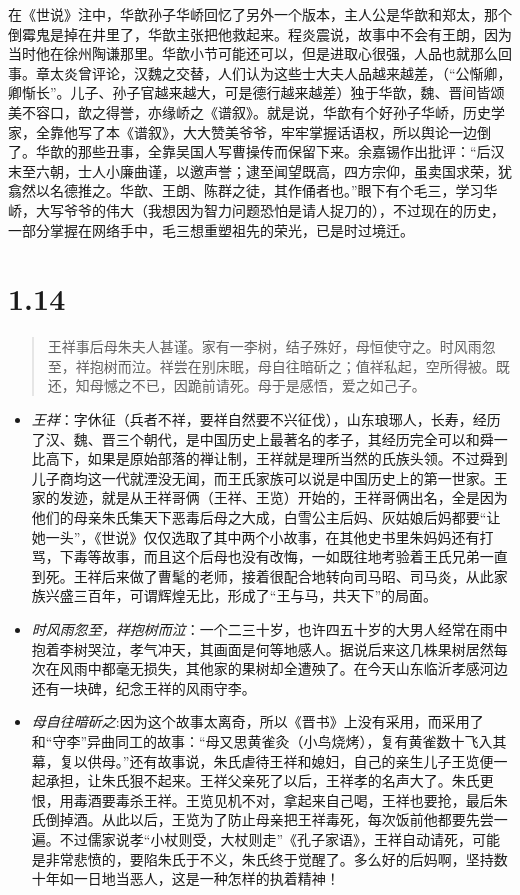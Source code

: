 \documentclass[]{book}
\providecommand{\tightlist}{%
  \setlength{\itemsep}{0pt}\setlength{\parskip}{0pt}}
\begin{document}
在《世说》注中，华歆孙子华峤回忆了另外一个版本，主人公是华歆和郑太，那个倒霉鬼是掉在井里了，华歆主张把他救起来。程炎震说，故事中不会有王朗，因为当时他在徐州陶谦那里。华歆小节可能还可以，但是进取心很强，人品也就那么回事。章太炎曾评论，汉魏之交替，人们认为这些士大夫人品越来越差，（``公惭卿，卿惭长''。儿子、孙子官越来越大，可是德行越来越差）独于华歆，魏、晋间皆颂美不容口，歆之得誉，亦缘峤之《谱叙》。就是说，华歆有个好孙子华峤，历史学家，全靠他写了本《谱叙》，大大赞美爷爷，牢牢掌握话语权，所以舆论一边倒了。华歆的那些丑事，全靠吴国人写曹操传而保留下来。余嘉锡作出批评：``后汉末至六朝，士人小廉曲谨，以邀声誉；逮至闻望既高，四方宗仰，虽卖国求荣，犹翕然以名德推之。华歆、王朗、陈群之徒，其作俑者也。''眼下有个毛三，学习华峤，大写爷爷的伟大（我想因为智力问题恐怕是请人捉刀的），不过现在的历史，一部分掌握在网络手中，毛三想重塑祖先的荣光，已是时过境迁。

\section{1.14}\label{section-13}

\begin{quote}
王祥事后母朱夫人甚谨。家有一李树，结子殊好，母恒使守之。时风雨忽至，祥抱树而泣。祥尝在别床眠，母自往暗斫之；值祥私起，空所得被。既还，知母憾之不已，因跪前请死。母于是感悟，爱之如己子。
\end{quote}

\begin{itemize}
\tightlist
\item
  \emph{王祥}：字休征（兵者不祥，要祥自然要不兴征伐），山东琅琊人，长寿，经历了汉、魏、晋三个朝代，是中国历史上最著名的孝子，其经历完全可以和舜一比高下，如果是原始部落的禅让制，王祥就是理所当然的氏族头领。不过舜到儿子商均这一代就湮没无闻，而王氏家族可以说是中国历史上的第一世家。王家的发迹，就是从王祥哥俩（王祥、王览）开始的，王祥哥俩出名，全是因为他们的母亲朱氏集天下恶毒后母之大成，白雪公主后妈、灰姑娘后妈都要``让她一头''，《世说》仅仅选取了其中两个小故事，在其他史书里朱妈妈还有打骂，下毒等故事，而且这个后母也没有改悔，一如既往地考验着王氏兄弟一直到死。王祥后来做了曹髦的老师，接着很配合地转向司马昭、司马炎，从此家族兴盛三百年，可谓辉煌无比，形成了``王与马，共天下''的局面。
\item
  \emph{时风雨忽至，祥抱树而泣}：一个二三十岁，也许四五十岁的大男人经常在雨中抱着李树哭泣，孝气冲天，其画面是何等地感人。据说后来这几株果树居然每次在风雨中都毫无损失，其他家的果树却全遭殃了。在今天山东临沂孝感河边还有一块碑，纪念王祥的风雨守李。
\item
  \emph{母自往暗斫之}:因为这个故事太离奇，所以《晋书》上没有采用，而采用了和``守李''异曲同工的故事：``母又思黄雀灸（小鸟烧烤），复有黄雀数十飞入其幕，复以供母。''还有故事说，朱氏虐待王祥和媳妇，自己的亲生儿子王览便一起承担，让朱氏狠不起来。王祥父亲死了以后，王祥孝的名声大了。朱氏更恨，用毒酒要毒杀王祥。王览见机不对，拿起来自己喝，王祥也要抢，最后朱氏倒掉酒。从此以后，王览为了防止母亲把王祥毒死，每次饭前他都要先尝一遍。不过儒家说孝``小杖则受，大杖则走''《孔子家语》，王祥自动请死，可能是非常悲愤的，要陷朱氏于不义，朱氏终于觉醒了。多么好的后妈啊，坚持数十年如一日地当恶人，这是一种怎样的执着精神！
\end{itemize}
\end{document}
